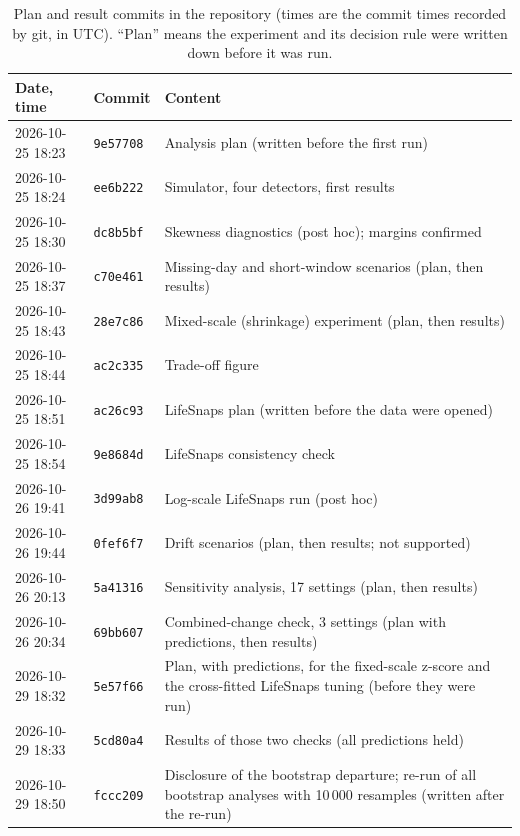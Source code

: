 \documentclass[11pt,a4paper]{article}
\begin{document}
\begin{table}[H]
\centering\small
\caption{Plan and result commits in the repository (times are the commit times recorded by git, in UTC). ``Plan'' means the experiment and its decision rule were written down before it was run.}
\begin{tabular}{@{}llp{9.2cm}@{}}
\toprule
Date, time & Commit & Content \\
\midrule
2026-10-25 18:23 & \texttt{9e57708} & Analysis plan (written before the first run) \\
2026-10-25 18:24 & \texttt{ee6b222} & Simulator, four detectors, first results \\
2026-10-25 18:30 & \texttt{dc8b5bf} & Skewness diagnostics (post hoc); margins confirmed \\
2026-10-25 18:37 & \texttt{c70e461} & Missing-day and short-window scenarios (plan, then results) \\
2026-10-25 18:43 & \texttt{28e7c86} & Mixed-scale (shrinkage) experiment (plan, then results) \\
2026-10-25 18:44 & \texttt{ac2c335} & Trade-off figure \\
2026-10-25 18:51 & \texttt{ac26c93} & LifeSnaps plan (written before the data were opened) \\
2026-10-25 18:54 & \texttt{9e8684d} & LifeSnaps consistency check \\
2026-10-26 19:41 & \texttt{3d99ab8} & Log-scale LifeSnaps run (post hoc) \\
2026-10-26 19:44 & \texttt{0fef6f7} & Drift scenarios (plan, then results; not supported) \\
2026-10-26 20:13 & \texttt{5a41316} & Sensitivity analysis, 17 settings (plan, then results) \\
2026-10-26 20:34 & \texttt{69bb607} & Combined-change check, 3 settings (plan with predictions, then results) \\
2026-10-29 18:32 & \texttt{5e57f66} & Plan, with predictions, for the fixed-scale z-score and the cross-fitted LifeSnaps tuning (before they were run) \\
2026-10-29 18:33 & \texttt{5cd80a4} & Results of those two checks (all predictions held) \\
2026-10-29 18:50 & \texttt{fccc209} & Disclosure of the bootstrap departure; re-run of all bootstrap analyses with 10\,000 resamples (written after the re-run) \\
\bottomrule
\end{tabular}
\end{table}
\end{document}
